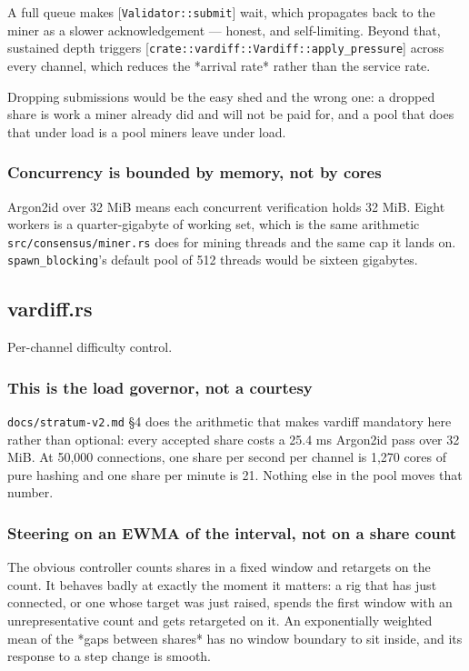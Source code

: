 \documentclass[11pt,a4paper]{article}
\begin{document}
A full queue makes [\texttt{Validator::submit}] wait, which propagates back to the
miner as a slower acknowledgement — honest, and self-limiting. Beyond that,
sustained depth triggers [\texttt{crate::vardiff::Vardiff::apply\_pressure}] across
every channel, which reduces the *arrival rate* rather than the service
rate.

Dropping submissions would be the easy shed and the wrong one: a dropped
share is work a miner already did and will not be paid for, and a pool that
does that under load is a pool miners leave under load.

\subsubsection{Concurrency is bounded by memory, not by cores}

Argon2id over 32 MiB means each concurrent verification holds 32 MiB. Eight
workers is a quarter-gigabyte of working set, which is the same arithmetic
\texttt{src/consensus/miner.rs} does for mining threads and the same cap it lands
on. \texttt{spawn\_blocking}'s default pool of 512 threads would be sixteen
gigabytes.

\subsection{vardiff.rs}
Per-channel difficulty control.

\subsubsection{This is the load governor, not a courtesy}

\texttt{docs/stratum-v2.md} §4 does the arithmetic that makes vardiff mandatory
here rather than optional: every accepted share costs a 25.4 ms Argon2id
pass over 32 MiB. At 50,000 connections, one share per second per channel is
1,270 cores of pure hashing and one share per minute is 21. Nothing else in
the pool moves that number.

\subsubsection{Steering on an EWMA of the interval, not on a share count}

The obvious controller counts shares in a fixed window and retargets on the
count. It behaves badly at exactly the moment it matters: a rig that has
just connected, or one whose target was just raised, spends the first window
with an unrepresentative count and gets retargeted on it. An exponentially
weighted mean of the *gaps between shares* has no window boundary to sit
inside, and its response to a step change is smooth.
\end{document}
